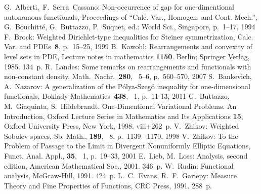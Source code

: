 \begin{thebibliography}{99}
 G.~Alberti,~F.~Serra~Cassano: Non-occurrence of gap for one-dimentional autonomous functionals,
Proceedings of ``Calc. Var., Homogen. and Cont. Mech.'', G.~Bouchitt\'e, G.~Buttazzo, P.~Suquet, ed.: World Sci., Singapore, p.~1--17, 1994
 F.~Brock: Weighted Dirichlet-type inequalities for Steiner symmetrization,
Calc. Var. and PDEs~{\bf8}, p.~15--25, 1999
 B.~Kawohl: Rearrangements and convexity of level sets in PDE,
Lecture notes in mathematics {\bf1150}. Berlin; Springer Verlag, 1985. 134~p.
 R.~Landes: Some remarks on rearrangements and functionals with non-constant density,
Math.~Nachr.~{\bf280}, \textnumero~5--6, p.~560--570, 2007
 S.~Bankevich, A.~Nazarov: A generalization of the P\'olya-Szeg\"o inequality for one-dimensional functionals,
Doklady Mathematics~{\bf438}, \textnumero~1, p.~11-13, 2011
 G.~Buttazzo, M.~Giaquinta, S.~Hildebrandt. One-Dimentional Variational Problems. An Introduction,
Oxford Lecture Series in Mathematics and Its Applications {\bf15},
Oxford University Press, New York, 1998. viii+262~p.
 V.~Zhikov: Weighted Sobolev spaces,
Sb. Math., {\bf189}, \textnumero~8, p.~1139–-1170, 1998
 V.~Zhikov: To the Problem of Passage to the Limit in Divergent Nonuniformly Elliptic Equations,
Funct. Anal. Appl., {\bf35}, \textnumero~1, p.~19--33, 2001
 E.~Lieb, M.~Loss: Analysis, second edition,
American Mathematical Soc., 2001. 346~p.
 W.~Rudin: Functional analysis,
McGraw-Hill, 1991. 424~p.
 L.~C.~Evans, R.~F.~Gariepy: Measure Theory and Fine Properties of Functions,
CRC Press, 1991. 288~p.

\end{thebibliography}
